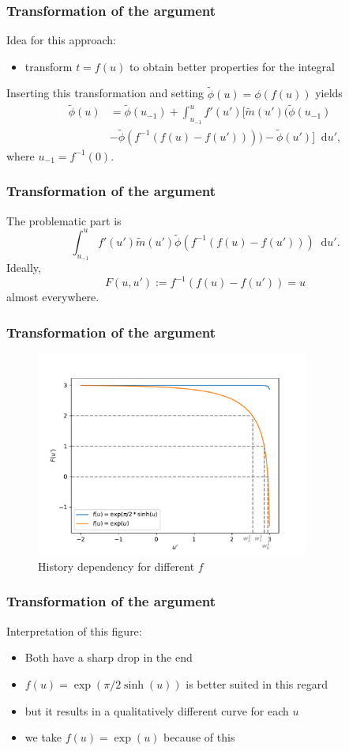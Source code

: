 \documentclass[12pt,a4paper,handout]{beamer}
\theoremstyle{definition}
\theoremstyle{plain}
\newcommand{\D}{\mathop{}\!\mathrm{d}}
\begin{document}
\begin{frame}
    \frametitle{Transformation of the argument}
    Idea for this approach:
    \begin{itemize}
        \item transform $t=f(u)$ to obtain better properties for the integral
    \end{itemize}
    Inserting this transformation and setting $\tilde\phi(u)=\phi(f(u))$ yields
    \begin{align*}
        \tilde{\phi}(u)&=\tilde{\phi}(u_{-1}) +\int_{u_{-1}}^{u}f'(u')[\tilde{m}(u')(\tilde\phi(u_{-1})\\&-\tilde{\phi}(f^{-1}(f(u)-f(u'))))-\tilde{\phi}(u')]\D u',
    \end{align*}
    where $u_{-1}=f^{-1}(0)$.
\end{frame}
\begin{frame}
    \frametitle{Transformation of the argument}
    The problematic part is
    \begin{equation*}
        \int_{u_{-1}}^{u}f'(u')\tilde{m}(u')\tilde{\phi}(f^{-1}(f(u)-f(u')))\D u'.
    \end{equation*}
    Ideally,
    \begin{equation*}
        F(u,u'):=f^{-1}(f(u)-f(u'))=u
    \end{equation*}
    almost everywhere.
\end{frame}
\begin{frame}
    \frametitle{Transformation of the argument}
    \begin{figure}
        \centering
        \includegraphics[width=0.8\textwidth]{HistoryF}
        \caption{History dependency for different $f$}
    \end{figure}
\end{frame}
\begin{frame}
    \frametitle{Transformation of the argument}
    Interpretation of this figure:
    \begin{itemize}[<+->]
        \item Both have a sharp drop in the end
        \item $f(u)=\exp(\pi/2\sinh(u))$ is better suited in this regard
        \item but it results in a qualitatively different curve for each $u$
        \item we take $f(u)=\exp(u)$ because of this 
    \end{itemize}
\end{frame}
\end{document}
